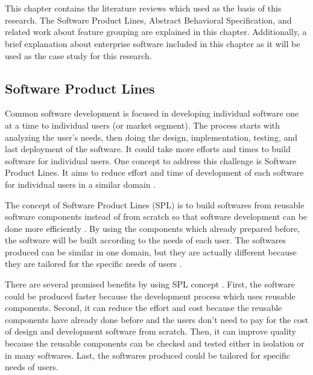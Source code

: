\chapter{\babDua}
This chapter contains the literature reviews which used as the basis of this research. The Software Product Lines, Abstract Behavioral Specification, and related work about feature grouping are explained in this chapter. Additionally, a brief explanation about enterprise software included in this chapter as it will be used as the case study for this research.

\section{Software Product Lines}
Common software development is focused in developing individual software one at a time to individual users (or market segment). The process starts with analyzing the user's needs, then doing the design, implementation, testing, and last deployment of the software. It could take more efforts and times to build software for individual users. One concept to address this challenge is Software Product Lines. It aims to reduce effort and time of development of each software for individual users in a similar domain \citep{book.apel.FeatureOrientedSoftware}.

The concept of Software Product Lines (SPL) is to build softwares from reusable software components instead of from scratch so that software development can be done more efficiently \citep{book.apel.FeatureOrientedSoftware}. By using the components which already prepared before, the software will be built according to the needs of each user. The softwares produced can be similar in one domain, but they are actually different because they are tailored for the specific needs of users \citep{paper.kastnerApel.FeatureOrientedSoftwareDevelopment}.

There are several promised benefits by using SPL concept \citep{book.apel.FeatureOrientedSoftware,paper.kastnerApel.FeatureOrientedSoftwareDevelopment,book.pohl2005.softwareProductLineEngineering}. First, the software could be produced faster because the development process which uses reusable components. Second, it can reduce the effort and cost because the reusable components have already done before and the users don't need to pay for the cost of design and development software from scratch. Then, it can improve quality because the reusable components can be checked and tested either in isolation or in many softwares. Last, the softwares produced could be tailored for specific needs of users.

